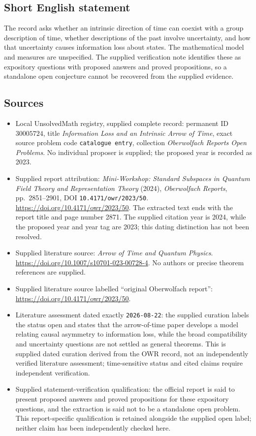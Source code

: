 \documentclass[11pt]{article}
\begin{document}
\subsection{Short English statement}
The record asks whether an intrinsic direction of time can coexist with a group description of time, whether descriptions of the past involve uncertainty, and how that uncertainty causes information loss about states. The mathematical model and measures are unspecified. The supplied verification note identifies these as expository questions with proposed answers and proved propositions, so a standalone open conjecture cannot be recovered from the supplied evidence.
\subsection{Sources}
\begin{itemize}
\item Local UnsolvedMath registry, supplied complete record: permanent ID \(30005724\), title \emph{Information Loss and an Intrinsic Arrow of Time}, exact source problem code \texttt{catalogue entry}, collection \emph{Oberwolfach Reports Open Problems}. No individual proposer is supplied; the proposed year is recorded as 2023.
\item Supplied report attribution: \emph{Mini-Workshop: Standard Subspaces in Quantum Field Theory and Representation Theory} (2024), \emph{Oberwolfach Reports}, pp.\ 2851--2901, DOI \texttt{10.4171/owr/2023/50}. \url{https://doi.org/10.4171/owr/2023/50}. The extracted text ends with the report title and page number 2871. The supplied citation year is 2024, while the proposed year and year tag are 2023; this dating distinction has not been resolved.
\item Supplied literature source: \emph{Arrow of Time and Quantum Physics}. \url{https://doi.org/10.1007/s10701-023-00728-4}. No authors or precise theorem references are supplied.
\item Supplied literature source labelled ``original Oberwolfach report'': \url{https://doi.org/10.4171/owr/2023/50}.
\item Literature assessment dated exactly \texttt{2026-08-22}: the supplied curation labels the status open and states that the arrow-of-time paper develops a model relating causal asymmetry to information loss, while the broad compatibility and uncertainty questions are not settled as general theorems. This is supplied dated curation derived from the OWR record, not an independently verified literature assessment; time-sensitive status and cited claims require independent verification.
\item Supplied statement-verification qualification: the official report is said to present proposed answers and proved propositions for these expository questions, and the extraction is said not to be a standalone open problem. This report-specific qualification is retained alongside the supplied open label; neither claim has been independently checked here.
\end{itemize}
\end{document}
